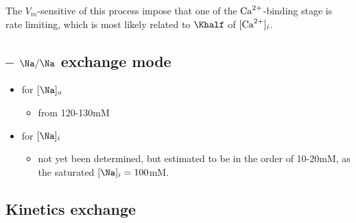 The $V_m$-sensitive of this process impose that one of the
${\text{Ca}^{2+}}$-binding stage is rate limiting, which is most likely related to
$\Khalf$ of $[{\text{Ca}^{2+}}]_i$.

\subsection{-- $\Na/\Na$ exchange mode}
\label{sec:nana-exchange-mode}

\begin{itemize}
\item for $[\Na]_o$
  \begin{itemize}
  \item from 120-130mM
  \end{itemize}
\item for $[\Na]_i$
  \begin{itemize}
  \item not yet been determined, but estimated to be in the order of
    10-20mM, as the saturated $[\Na]_i=100$mM. 
  \end{itemize}
\end{itemize}


\subsection{Kinetics exchange}
\label{sec:kinetics-exchange}


